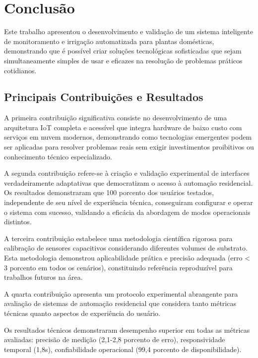 \chapter{Conclusão}

Este trabalho apresentou o desenvolvimento e validação de um sistema inteligente de monitoramento e irrigação automatizada para plantas domésticas, demonstrando que é possível criar soluções tecnológicas sofisticadas que sejam simultaneamente simples de usar e eficazes na resolução de problemas práticos cotidianos.

\section{Principais Contribuições e Resultados}

A primeira contribuição significativa consiste no desenvolvimento de uma arquitetura IoT completa e acessível que integra hardware de baixo custo com serviços em nuvem modernos, demonstrando como tecnologias emergentes podem ser aplicadas para resolver problemas reais sem exigir investimentos proibitivos ou conhecimento técnico especializado.

A segunda contribuição refere-se à criação e validação experimental de interfaces verdadeiramente adaptativas que democratizam o acesso à automação residencial. Os resultados demonstraram que 100 porcento dos usuários testados, independente de seu nível de experiência técnica, conseguiram configurar e operar o sistema com sucesso, validando a eficácia da abordagem de modos operacionais distintos.

A terceira contribuição estabelece uma metodologia científica rigorosa para calibração de sensores capacitivos considerando diferentes volumes de substrato. Esta metodologia demonstrou aplicabilidade prática e precisão adequada (erro < 3 porcento em todos os cenários), constituindo referência reproduzível para trabalhos futuros na área.

A quarta contribuição apresenta um protocolo experimental abrangente para avaliação de sistemas de automação residencial que considera tanto métricas técnicas quanto aspectos de experiência do usuário.

Os resultados técnicos demonstraram desempenho superior em todas as métricas avaliadas: precisão de medição (2,1-2,8 porcento de erro), responsividade temporal (1,8s), confiabilidade operacional (99,4 porcento de disponibilidade).

